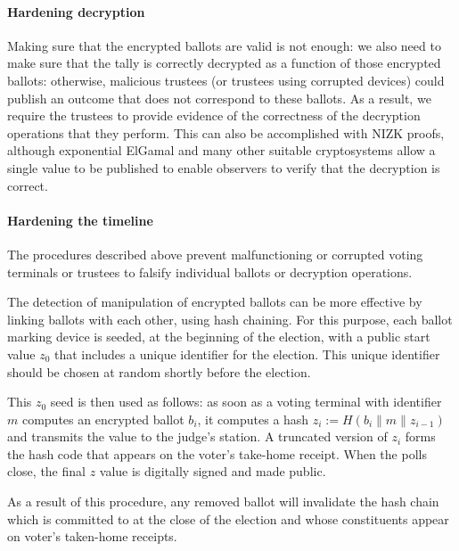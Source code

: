 \paragraph{Hardening decryption}
\label{sec:hardening-decryption}
Making sure that the encrypted ballots are valid is not enough: we
also need to make sure that the tally is correctly decrypted as a
function of those encrypted ballots: otherwise, malicious trustees (or
trustees using corrupted devices) could publish an outcome that does
not correspond to these ballots. As a result, we require the trustees
to provide evidence of the correctness of the decryption operations
that they perform.  This can also be accomplished with NIZK proofs,
although exponential ElGamal and many other suitable cryptosystems
allow a single value to be published to enable observers to verify that
the decryption is correct.

\paragraph{Hardening the timeline}
\label{sec:hard-timeline}

The procedures described above prevent malfunctioning or corrupted
voting terminals or trustees to falsify individual ballots or decryption
operations.

The detection of manipulation of encrypted ballots can be more
effective by linking ballots with each other, using hash chaining.
For this purpose, each ballot marking device is seeded, at the beginning
of the election, with a public start value $z_0$ that includes a
unique identifier for the election.
This unique identifier should be chosen at random shortly before the
election.


This $z_0$ seed is then used as follows: as soon as a voting terminal
with identifier $m$ computes an encrypted ballot $b_i$, it
computes a hash $z_i := H(b_i \| m \| z_{i-1})$ and transmits the value
to the judge's station. A truncated version of $z_i$ forms the hash code
that appears on the voter's take-home receipt.  When the polls close,
the final $z$ value is digitally signed and made public.

As a result of this procedure, any removed ballot will
invalidate the hash chain which is committed to at the close of the
election and whose constituents appear on voter's taken-home receipts.

